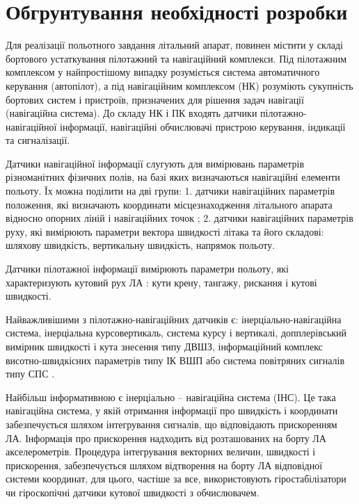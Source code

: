 \section{Обгрунтування необхідності розробки}

Для реалізації польотного завдання літальний апарат, повинен містити у складі 
бортового устаткування пілотажний та навігаційний комплекси. Під пілотажним 
комплексом у найпростішому випадку розуміється система автоматичного керування 
(автопілот), а під навігаційним комплексом (НК)  
розуміють сукупність бортових систем і пристроїв, призначених для рішення задач 
навігації (навігаційна система). До складу НК і ПК входять датчики 
пілотажно-навігаційної інформації, навігаційні обчислювачі пристрою керування, 
індикації та сигналізації.

Датчики навігаційної інформації слугують для вимірювань параметрів різноманітних 
фізичних полів, на базі яких визначаються навігаційні елементи польоту. Їх 
можна поділити на дві групи: 1. датчики навігаційних параметрів положення, 
які визначають координати місцезнаходження літального апарата відносно опорних 
ліній і навігаційних точок ; 2. датчики навігаційних параметрів руху, які 
вимірюють параметри вектора швидкості літака та його складові: шляхову 
швидкість, вертикальну швидкість, напрямок польоту.

Датчики пілотажної інформації вимірюють параметри польоту, які характеризують кутовий 
рух ЛА : кути крену, тангажу, рискання і кутові швидкості.

Найважливішими з пілотажно-навігаційних датчиків є: інерціально-навігаційна 
система, інерціальна курсовертикаль, система курсу і вертикалі, допплерівський 
вимірник швидкості  і кута знесення типу ДВШЗ, інформаційний комплекс 
висотно-швидкісних параметрів типу ІК ВШП або система повітряних сигналів 
типу СПС .

Найбільш інформативною є інерціально – навігаційна  система (ІНС). 
Це така навігаційна система, у якій отримання інформації про швидкість і координати 
забезпечується шляхом інтегрування сигналів, що відповідають прискоренням ЛА. 
Інформація про прискорення надходить від розташованих на борту ЛА 
акселерометрів. Процедура інтегрування векторних величин, швидкості і 
прискорення, забезпечується шляхом відтворення на борту ЛА  відповідної 
системи координат, для цього, частіше за все, використовують гіростабілізатори 
чи гіроскопічні датчики кутової швидкості з обчислювачем. 



